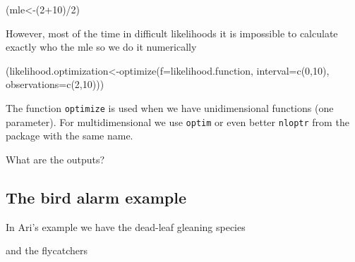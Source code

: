 \documentclass[
]{book}
\newenvironment{Shaded}{\begin{snugshade}}{\end{snugshade}}
\newcommand{\AttributeTok}[1]{\textcolor[rgb]{0.77,0.63,0.00}{#1}}
\newcommand{\CommentTok}[1]{\textcolor[rgb]{0.56,0.35,0.01}{\textit{#1}}}
\newcommand{\DecValTok}[1]{\textcolor[rgb]{0.00,0.00,0.81}{#1}}
\newcommand{\FunctionTok}[1]{\textcolor[rgb]{0.00,0.00,0.00}{#1}}
\newcommand{\NormalTok}[1]{#1}
\newcommand{\OtherTok}[1]{\textcolor[rgb]{0.56,0.35,0.01}{#1}}
\newcommand{\SpecialCharTok}[1]{\textcolor[rgb]{0.00,0.00,0.00}{#1}}
\newcommand{\StringTok}[1]{\textcolor[rgb]{0.31,0.60,0.02}{#1}}
\begin{document}
\begin{Shaded}
\begin{Highlighting}[]
\NormalTok{(mle}\OtherTok{\textless{}{-}}\NormalTok{(}\DecValTok{2}\SpecialCharTok{+}\DecValTok{10}\NormalTok{)}\SpecialCharTok{/}\DecValTok{2}\NormalTok{)}
\end{Highlighting}
\end{Shaded}

However, most of the time in difficult likelihoods it is impossible to calculate exactly who the mle so we do it numerically

\begin{Shaded}
\begin{Highlighting}[]
\NormalTok{(likelihood.optimization}\OtherTok{\textless{}{-}}\FunctionTok{optimize}\NormalTok{(}\AttributeTok{f=}\NormalTok{likelihood.function, }\AttributeTok{interval=}\FunctionTok{c}\NormalTok{(}\DecValTok{0}\NormalTok{,}\DecValTok{10}\NormalTok{), }\AttributeTok{observations=}\FunctionTok{c}\NormalTok{(}\DecValTok{2}\NormalTok{,}\DecValTok{10}\NormalTok{)))}
\end{Highlighting}
\end{Shaded}

The function \texttt{optimize} is used when we have unidimensional functions (one parameter). For multidimensional we use \texttt{optim} or even better \texttt{nloptr} from the package with the same name.

What are the outputs?

\hypertarget{the-bird-alarm-example}{%
\subsection{The bird alarm example}\label{the-bird-alarm-example}}

In Ari's example we have the dead-leaf gleaning species

\begin{Shaded}
\end{Shaded}

and the flycatchers

\begin{Shaded}
\end{Shaded}
\end{document}
